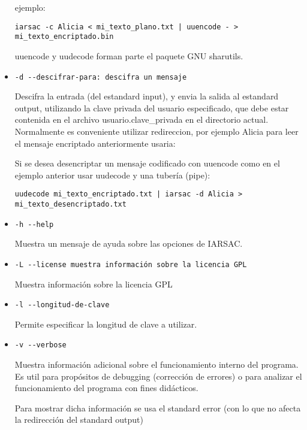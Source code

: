 \documentclass[spanish]{article}
\begin{document}
\begin{itemize}
ejemplo:
\begin{verbatim}
iarsac -c Alicia < mi_texto_plano.txt | uuencode - > mi_texto_encriptado.bin
\end{verbatim}

uuencode y uudecode forman parte el paquete GNU sharutils.

\item
\begin{verbatim}
-d --descifrar-para: descifra un mensaje 
\end{verbatim}

Descifra la entrada (del estandard input), y envia la salida al
estandard output, utilizando la clave privada del usuario especificado, que
debe estar contenida en el archivo usuario.clave\_privada en el directorio
actual. Normalmente es conveniente utilizar redireccion, 
por ejemplo Alicia para leer el mensaje encriptado anteriormente 
usaria:

Si se desea desencriptar un mensaje codificado con uuencode como en el
ejemplo anterior usar uudecode y una tubería (pipe):

\begin{verbatim}
uudecode mi_texto_encriptado.txt | iarsac -d Alicia > mi_texto_desencriptado.txt
\end{verbatim}


\item 
\begin{verbatim}
-h --help
\end{verbatim}

Muestra un mensaje de ayuda sobre las opciones de IARSAC.

\item
\begin{verbatim} 
-L --license muestra información sobre la licencia GPL 
\end{verbatim}

Muestra información sobre la licencia GPL 

\item 
\begin{verbatim}
-l --longitud-de-clave 
\end{verbatim}

Permite especificar la longitud de clave a utilizar.

\item
\begin{verbatim}
-v --verbose 
\end{verbatim}

Muestra información adicional sobre el funcionamiento interno del programa. Es
util para propósitos de debugging (corrección de errores) o para analizar el
funcionamiento del programa con fines didácticos.

Para mostrar dicha información se usa el standard error (con lo que no 
afecta la redirección del standard output)

\end{itemize}
\end{document}
